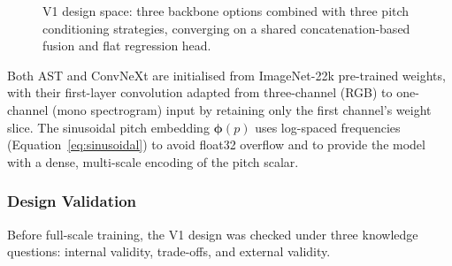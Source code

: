 \begin{figure}[H]
\vspace{0.3cm}
\caption{V1 design space: three backbone options combined with three pitch conditioning strategies, converging on a shared concatenation-based fusion and flat regression head.}
\label{fig:v1_design}
\end{figure}

\noindent
Both AST and ConvNeXt are initialised from ImageNet-22k pre-trained weights, with their first-layer convolution adapted from three-channel (RGB) to one-channel (mono spectrogram) input by retaining only the first channel's weight slice. The sinusoidal pitch embedding $\boldsymbol{\phi}(p)$ uses log-spaced frequencies (Equation~\ref{eq:sinusoidal}) to avoid float32 overflow and to provide the model with a dense, multi-scale encoding of the pitch scalar.

\subsubsection{Design Validation}

\noindent
Before full-scale training, the V1 design was checked under three knowledge questions: internal validity, trade-offs, and external validity.

